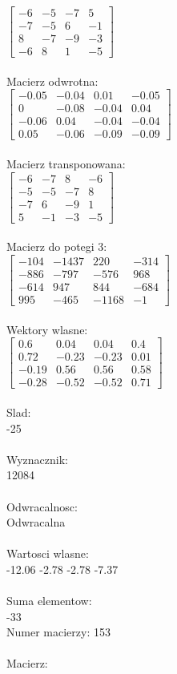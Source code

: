 \documentclass[a4paper,12pt]{article}
\begin{document}
$\begin{bmatrix} -6&-5&-7&5\\-7&-5&6&-1\\8&-7&-9&-3\\-6&8&1&-5 \end{bmatrix}$
\\
\\
Macierz odwrotna:\\

$\begin{bmatrix} -0.05&-0.04&0.01&-0.05\\0&-0.08&-0.04&0.04\\-0.06&0.04&-0.04&-0.04\\0.05&-0.06&-0.09&-0.09 \end{bmatrix}$
\\
\\
Macierz transponowana:\\

$\begin{bmatrix} -6&-7&8&-6\\-5&-5&-7&8\\-7&6&-9&1\\5&-1&-3&-5 \end{bmatrix}$
\\
\\
Macierz do potegi 3:\\

$\begin{bmatrix} -104&-1437&220&-314\\-886&-797&-576&968\\-614&947&844&-684\\995&-465&-1168&-1 \end{bmatrix}$
\\
\\
Wektory wlasne:\\

$\begin{bmatrix} 0.6&0.04&0.04&0.4\\0.72&-0.23&-0.23&0.01\\-0.19&0.56&0.56&0.58\\-0.28&-0.52&-0.52&0.71 \end{bmatrix}$
\\
\\
Slad:\\
-25
\\
\\
Wyznacznik:\\
12084
\\
\\
Odwracalnosc:\\
Odwracalna
\\
\\
Wartosci wlasne:\\
-12.06 -2.78 -2.78 -7.37
\\
\\
Suma elementow:\\
-33
\\
\newpage
Numer macierzy:
153
\\
\\
Macierz:\\
\end{document}
